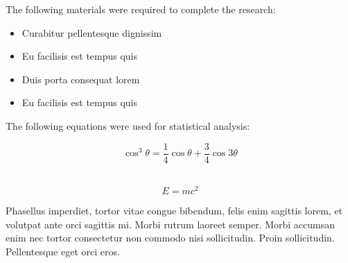 \documentclass[a0paper,fontscale=0.35]{baposter} %
\newcommand{\compresslist}{ %
\setlength{\itemsep}{1pt}
\setlength{\parskip}{0pt}
\setlength{\parsep}{0pt}
}
\begin{document}
\begin{poster}
{The following materials were required to complete the research:

\begin{itemize}\compresslist
\item Curabitur pellentesque dignissim
\item Eu facilisis est tempus quis
\item Duis porta consequat lorem
\item Eu facilisis est tempus quis
\end{itemize}

The following equations were used for statistical analysis:

\begin{equation}
\cos^3 \theta =\frac{1}{4}\cos\theta+\frac{3}{4}\cos 3\theta
\label{eq:refname}
\end{equation}\

\begin{equation}
E = mc^{2}
\label{eqn:Einstein}
\end{equation}

Phasellus imperdiet, tortor vitae congue bibendum, felis enim sagittis lorem, et volutpat ante orci sagittis mi. Morbi rutrum laoreet semper. Morbi accumsan enim nec tortor consectetur non commodo nisi sollicitudin. Proin sollicitudin. Pellentesque eget orci eros.
}




\end{poster}
\end{document}
